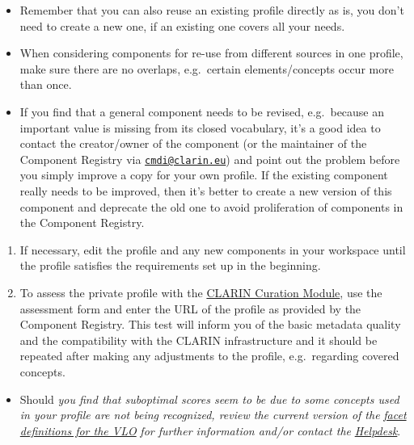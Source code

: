 \documentclass[]{article}
\providecommand{\tightlist}{%
  \setlength{\itemsep}{0pt}\setlength{\parskip}{0pt}}
\begin{document}
\begin{itemize}
\tightlist
\item
  Remember that you can also reuse an existing profile directly as is,
  you don't need to create a new one, if an existing one covers all your
  needs.
\item
  When considering components for re-use from different sources in one
  profile, make sure there are no overlaps, e.g.~certain
  elements/concepts occur more than once.
\item
  If you find that a general component needs to be revised, e.g.~because
  an important value is missing from its closed vocabulary, it's a good
  idea to contact the creator/owner of the component (or the maintainer
  of the Component Registry via
  \href{mailto:cmdi@clarin.eu}{\nolinkurl{cmdi@clarin.eu}}) and point
  out the problem before you simply improve a copy for your own profile.
  If the existing component really needs to be improved, then it's
  better to create a new version of this component and deprecate the old
  one to avoid proliferation of components in the Component Registry.
\end{itemize}

\begin{enumerate}
\def\labelenumi{\arabic{enumi}.}
\setcounter{enumi}{2}
\tightlist
\item
  If necessary, edit the profile and any new components in your
  workspace until the profile satisfies the requirements set up in the
  beginning.
\item
  To assess the private profile with the
  \href{https://clarin.oeaw.ac.at/curate/}{CLARIN Curation Module}, use
  the assessment form and enter the URL of the profile as provided by
  the Component Registry. This test will inform you of the basic
  metadata quality and the compatibility with the CLARIN infrastructure
  and it should be repeated after making any adjustments to the profile,
  e.g.~regarding covered concepts.
\end{enumerate}

\begin{itemize}
\tightlist
\item
  Should \emph{you find that suboptimal scores seem to be due to some
  concepts used in your profile are not being recognized, review the
  current version of the}
  \href{https://github.com/clarin-eric/VLO/blob/master/vlo-commons/src/main/resources/facetConcepts.xml}{\emph{facet
  definitions for the VLO}} \emph{for further information and/or contact
  the} \href{mailto:vlo@clarin.eu}{\emph{Helpdesk}}.
\end{itemize}
\end{document}
